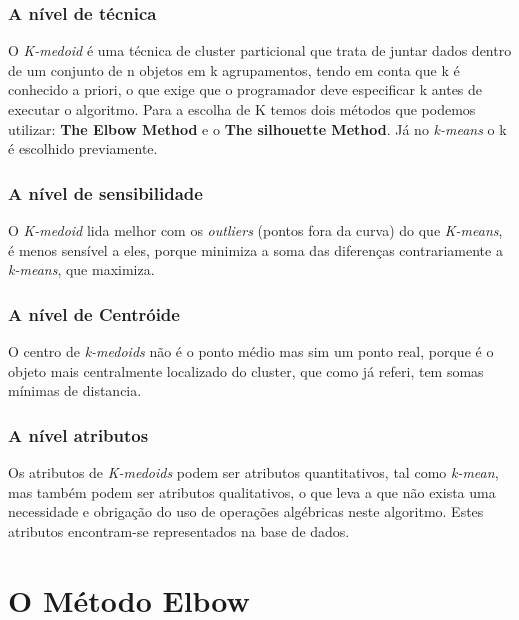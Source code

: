 \documentclass[12pt, a4paper, oneside]{scrreport}
\begin{document}
\subsection{A nível de técnica}
\quad O \textit{K-medoid} é uma técnica de cluster particional que trata de juntar dados dentro de um conjunto de n objetos em k agrupamentos, tendo em conta que k é conhecido a priori, o que exige que o programador deve especificar k antes de executar o algoritmo. Para a escolha de K temos dois métodos que podemos utilizar: \textbf{The Elbow Method} e o \textbf{The silhouette Method}. Já no \textit{k-means} o k é escolhido previamente. 
\subsection{A nível de sensibilidade}
\quad O \textit{K-medoid} lida melhor com os \textit{outliers} (pontos fora da curva) do que \textit{K-means}, é menos sensível a eles, porque minimiza a soma das diferenças contrariamente a \textit{k-means}, que maximiza.
\subsection{A nível de Centróide}
\quad O centro de \textit{k-medoids} não é o ponto médio mas sim um ponto real, porque é o objeto mais centralmente localizado do cluster, que como já referi, tem somas mínimas de distancia.
\subsection{A nível atributos}
\quad Os atributos de \textit{K-medoids} podem ser atributos quantitativos, tal como \textit{k-mean}, mas também podem ser atributos qualitativos, o que leva a que não exista uma necessidade e obrigação do uso de operações algébricas neste algoritmo. Estes atributos encontram-se representados na base de dados.



\chapter{O Método Elbow}
\end{document}
